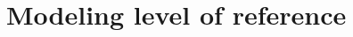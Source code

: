 \documentclass[10pt,letterpaper]{article}
\newcommand{\denote}[1]{\mbox{ $[\![ #1 ]\!]$}}
\begin{document}
\section{\bf Modeling level of reference}
%
%
\end{document}
